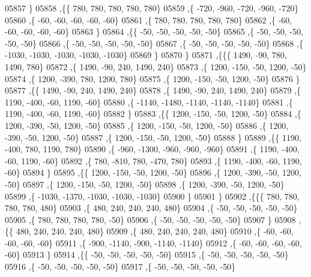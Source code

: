 \begin{DoxyCode}
05857     \}
05858    ,\{\{   780,   780,   780,   780,   780\}
05859     ,\{  -720,  -960,  -720,  -960,  -720\}
05860     ,\{   -60,   -60,   -60,   -60,   -60\}
05861     ,\{   780,   780,   780,   780,   780\}
05862     ,\{   -60,   -60,   -60,   -60,   -60\}
05863     \}
05864    ,\{\{   -50,   -50,   -50,   -50,   -50\}
05865     ,\{   -50,   -50,   -50,   -50,   -50\}
05866     ,\{   -50,   -50,   -50,   -50,   -50\}
05867     ,\{   -50,   -50,   -50,   -50,   -50\}
05868     ,\{ -1030, -1030, -1030, -1030, -1030\}
05869     \}
05870    \}
05871   ,\{\{\{  1490,   -90,   780,  1490,   780\}
05872     ,\{  1490,   -90,   240,  1490,   240\}
05873     ,\{  1200,  -150,   -50,  1200,   -50\}
05874     ,\{  1200,  -390,   780,  1200,   780\}
05875     ,\{  1200,  -150,   -50,  1200,   -50\}
05876     \}
05877    ,\{\{  1490,   -90,   240,  1490,   240\}
05878     ,\{  1490,   -90,   240,  1490,   240\}
05879     ,\{  1190,  -400,   -60,  1190,   -60\}
05880     ,\{ -1140, -1480, -1140, -1140, -1140\}
05881     ,\{  1190,  -400,   -60,  1190,   -60\}
05882     \}
05883    ,\{\{  1200,  -150,   -50,  1200,   -50\}
05884     ,\{  1200,  -390,   -50,  1200,   -50\}
05885     ,\{  1200,  -150,   -50,  1200,   -50\}
05886     ,\{  1200,  -390,   -50,  1200,   -50\}
05887     ,\{  1200,  -150,   -50,  1200,   -50\}
05888     \}
05889    ,\{\{  1190,  -400,   780,  1190,   780\}
05890     ,\{  -960, -1300,  -960,  -960,  -960\}
05891     ,\{  1190,  -400,   -60,  1190,   -60\}
05892     ,\{   780,  -810,   780,  -470,   780\}
05893     ,\{  1190,  -400,   -60,  1190,   -60\}
05894     \}
05895    ,\{\{  1200,  -150,   -50,  1200,   -50\}
05896     ,\{  1200,  -390,   -50,  1200,   -50\}
05897     ,\{  1200,  -150,   -50,  1200,   -50\}
05898     ,\{  1200,  -390,   -50,  1200,   -50\}
05899     ,\{ -1030, -1370, -1030, -1030, -1030\}
05900     \}
05901    \}
05902   ,\{\{\{   780,   780,   780,   780,   480\}
05903     ,\{   480,   240,   240,   240,   480\}
05904     ,\{   -50,   -50,   -50,   -50,   -50\}
05905     ,\{   780,   780,   780,   780,   -50\}
05906     ,\{   -50,   -50,   -50,   -50,   -50\}
05907     \}
05908    ,\{\{   480,   240,   240,   240,   480\}
05909     ,\{   480,   240,   240,   240,   480\}
05910     ,\{   -60,   -60,   -60,   -60,   -60\}
05911     ,\{  -900, -1140,  -900, -1140, -1140\}
05912     ,\{   -60,   -60,   -60,   -60,   -60\}
05913     \}
05914    ,\{\{   -50,   -50,   -50,   -50,   -50\}
05915     ,\{   -50,   -50,   -50,   -50,   -50\}
05916     ,\{   -50,   -50,   -50,   -50,   -50\}
05917     ,\{   -50,   -50,   -50,   -50,   -50\}

\end{DoxyCode}
